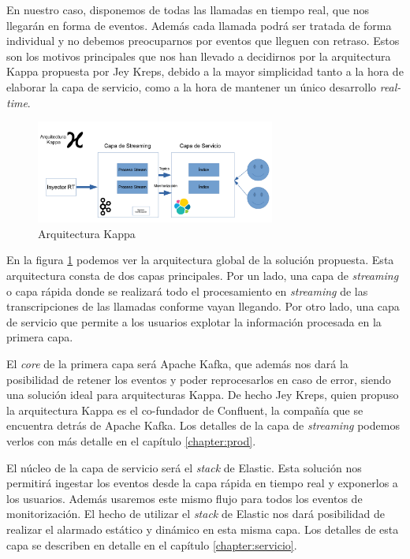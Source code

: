 En nuestro caso, disponemos de todas las llamadas en tiempo real, que nos llegarán en forma de eventos. Además cada llamada podrá ser tratada de forma individual y no debemos preocuparnos por eventos que lleguen con retraso. Estos son los motivos principales que nos han llevado a decidirnos por la arquitectura Kappa propuesta por Jey Kreps, debido a la mayor simplicidad tanto a la hora de elaborar la capa de servicio, como a la hora de mantener un único desarrollo \textit{real-time}. 





\begin{figure}[!ht]
	\centering
	\includegraphics[width=0.70\textwidth]{images/arqu/kappa}
	\caption{Arquitectura Kappa}
	\label{fig:kappa2}
\end{figure}


En la figura \ref{fig:kappa2} podemos ver la arquitectura global de la solución propuesta. Esta arquitectura consta de dos capas principales. Por un lado, una capa de \textit{streaming} o capa rápida donde se realizará todo el procesamiento en \textit{streaming} de las transcripciones de las llamadas conforme vayan llegando. Por otro lado, una capa de servicio que permite a los usuarios explotar la información procesada en la primera capa. 

El \textit{core} de la primera capa será Apache Kafka, que además nos dará la posibilidad de retener los eventos y poder reprocesarlos en caso de error, siendo una solución ideal para arquitecturas Kappa. De hecho Jey Kreps, quien propuso la arquitectura Kappa es el co-fundador de Confluent, la compañía que se encuentra detrás de Apache Kafka. Los detalles de la capa de \textit{streaming} podemos verlos con más detalle en el capítulo \ref{chapter:prod}.

El núcleo de la capa de servicio será el \textit{stack} de Elastic. Esta solución nos permitirá ingestar los eventos desde la capa rápida en tiempo real y exponerlos a los usuarios. Además usaremos este mismo flujo para todos los eventos de monitorización. El hecho de utilizar el \textit{stack} de Elastic nos dará posibilidad de realizar el alarmado estático y dinámico en esta misma capa.  Los detalles de esta capa se describen en detalle en el capítulo \ref{chapter:servicio}. 




